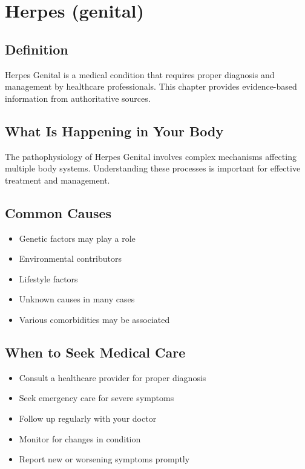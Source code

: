 
\chapter{Herpes (genital)}

\section*{Definition}
Herpes Genital is a medical condition that requires proper diagnosis and management by healthcare professionals. This chapter provides evidence-based information from authoritative sources.

\section*{What Is Happening in Your Body}
The pathophysiology of Herpes Genital involves complex mechanisms affecting multiple body systems. Understanding these processes is important for effective treatment and management.

\section*{Common Causes}
\begin{itemize}
  \item Genetic factors may play a role
  \item Environmental contributors
  \item Lifestyle factors
  \item Unknown causes in many cases
  \item Various comorbidities may be associated
\end{itemize}

\section*{When to Seek Medical Care}
\begin{itemize}
  \item Consult a healthcare provider for proper diagnosis
  \item Seek emergency care for severe symptoms
  \item Follow up regularly with your doctor
  \item Monitor for changes in condition
  \item Report new or worsening symptoms promptly
\end{itemize}

